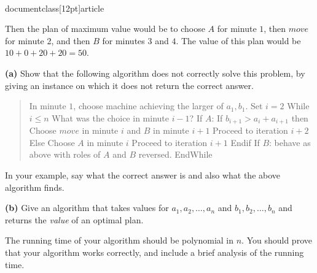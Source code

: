 \\documentclass[12pt]{article}
\begin{document}
\begin{enumerate}
Then the plan of maximum value would be to choose
$A$ for minute $1$, then $move$ for minute 2,
and then $B$ for minutes $3$ and $4$.
The value of this plan would be $10 + 0 + 20 + 20 = 50$.

\bigskip
\bigskip

{\bf (a)} Show that the following algorithm does not
correctly solve this problem, by giving an instance on which
it does not return the correct answer.
\begin{quote}
\begin{code}
In minute $1$, choose machine achieving the larger of $a_1, b_1$.
Set $i=2$
While $i \le n$
   What was the choice in minute $i-1$?
   If $A$:
      If $b_{i+1} > a_i + a_{i+1}$ then
         Choose $move$ in minute $i$ and $B$ in minute $i+1$
         Proceed to iteration $i+2$
      Else
         Choose $A$ in minute $i$
         Proceed to iteration $i+1$
      Endif
   If $B$: behave as above with roles of $A$ and $B$ reversed.
EndWhile
\end{code}
\end{quote}
In your example, say what the correct answer is and
also what the above algorithm finds.


{\bf (b)} 
Give an algorithm that takes values for
$a_1, a_2, \ldots, a_n$ and $b_1, b_2, \ldots, b_n$
and returns the {\em value} of an optimal plan.

The running time of your algorithm should be polynomial in $n$.
You should prove that your algorithm works correctly, and include a
brief analysis of the running time.

\end{enumerate}
\end{document}
